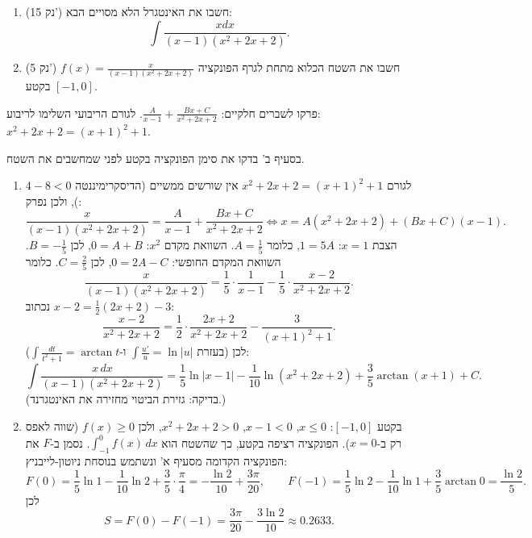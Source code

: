 
\begin{question}
\begin{enumerate}
  \item (15 נק') חשבו את האינטגרל הלא מסויים הבא:
  \[ \int\frac{xdx}{(x-1)(x^2+2x+2)}. \]
  \item (5 נק') חשבו את השטח הכלוא מתחת לגרף הפונקציה $f(x)=\frac{x}{(x-1)(x^2+2x+2)}$ בקטע $[-1,0]$.
\end{enumerate}
\end{question}

\begin{hint}
פרקו לשברים חלקיים: $\frac{A}{x-1}+\frac{Bx+C}{x^2+2x+2}$. לגורם הריבועי השלימו לריבוע: $x^2+2x+2=(x+1)^2+1$.
\end{hint}

\begin{hint}
בסעיף ב' בדקו את סימן הפונקציה בקטע לפני שמחשבים את השטח.
\end{hint}

\begin{solution}
\begin{enumerate}
  \item לגורם $x^2+2x+2=(x+1)^2+1$ אין שורשים ממשיים (הדיסקרימיננטה $4-8<0$), ולכן נפרק:
  \[ \frac{x}{(x-1)(x^2+2x+2)}=\frac{A}{x-1}+\frac{Bx+C}{x^2+2x+2}
     \iff x=A(x^2+2x+2)+(Bx+C)(x-1). \]
  הצבת $x=1$: $1=5A$, כלומר $A=\frac15$. השוואת מקדם $x^2$: $0=A+B$, לכן $B=-\frac15$. השוואת המקדם החופשי: $0=2A-C$, לכן $C=\frac25$. כלומר
  \[ \frac{x}{(x-1)(x^2+2x+2)}=\frac{1}{5}\cdot\frac{1}{x-1}-\frac15\cdot\frac{x-2}{x^2+2x+2}. \]
  נכתוב $x-2=\frac12(2x+2)-3$:
  \[ \frac{x-2}{x^2+2x+2}=\frac12\cdot\frac{2x+2}{x^2+2x+2}-\frac{3}{(x+1)^2+1}. \]
  לכן (בעזרת $\int\frac{u'}{u}=\ln|u|$ ו-$\int\frac{dt}{t^2+1}=\arctan t$):
  \[ \boxed{\int\frac{x\,dx}{(x-1)(x^2+2x+2)}=\frac15\ln|x-1|-\frac1{10}\ln(x^2+2x+2)+\frac35\arctan(x+1)+C.} \]
  (בדיקה: גזירת הביטוי מחזירה את האינטגרנד.)

  \item בקטע $[-1,0]$: $x\le 0$, $x-1<0$, $x^2+2x+2>0$, ולכן $f(x)\ge0$ (שווה לאפס רק ב-$x=0$). הפונקציה רציפה בקטע, כך שהשטח הוא $\int_{-1}^0 f(x)\,dx$. נסמן ב-$F$ את הפונקציה הקדומה מסעיף א' ונשתמש בנוסחת ניוטון-לייבניץ:
  \[ F(0)=\frac15\ln1-\frac1{10}\ln2+\frac35\cdot\frac\pi4=-\frac{\ln2}{10}+\frac{3\pi}{20},\qquad
     F(-1)=\frac15\ln2-\frac1{10}\ln1+\frac35\arctan0=\frac{\ln 2}{5}. \]
  לכן
  \[ S=F(0)-F(-1)=\boxed{\frac{3\pi}{20}-\frac{3\ln2}{10}}\approx 0.2633. \]
\end{enumerate}
\end{solution}
